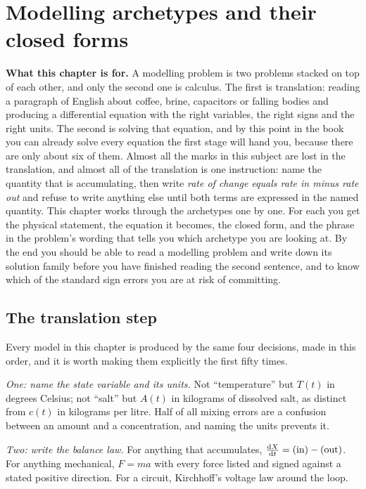 \chapter{Modelling archetypes and their closed forms}

\begin{orient}
\textbf{What this chapter is for.} A modelling problem is two problems stacked on top of each other, and only the second one is calculus. The first is translation: reading a paragraph of English about coffee, brine, capacitors or falling bodies and producing a differential equation with the right variables, the right signs and the right units. The second is solving that equation, and by this point in the book you can already solve every equation the first stage will hand you, because there are only about six of them. Almost all the marks in this subject are lost in the translation, and almost all of the translation is one instruction: name the quantity that is accumulating, then write \emph{rate of change equals rate in minus rate out} and refuse to write anything else until both terms are expressed in the named quantity. This chapter works through the archetypes one by one. For each you get the physical statement, the equation it becomes, the closed form, and the phrase in the problem's wording that tells you which archetype you are looking at. By the end you should be able to read a modelling problem and write down its solution family before you have finished reading the second sentence, and to know which of the standard sign errors you are at risk of committing.
\end{orient}

\section{The translation step}

Every model in this chapter is produced by the same four decisions, made in this order, and it is worth making them explicitly the first fifty times.

\emph{One: name the state variable and its units.} Not ``temperature'' but $T(t)$ in degrees Celsius; not ``salt'' but $A(t)$ in kilograms of dissolved salt, as distinct from $c(t)$ in kilograms per litre. Half of all mixing errors are a confusion between an amount and a concentration, and naming the units prevents it.

\emph{Two: write the balance law.} For anything that accumulates, $\frac{\mathrm{d}X}{\mathrm{d}t}=(\text{in})-(\text{out})$. For anything mechanical, $F=ma$ with every force listed and signed against a stated positive direction. For a circuit, Kirchhoff's voltage law around the loop.

